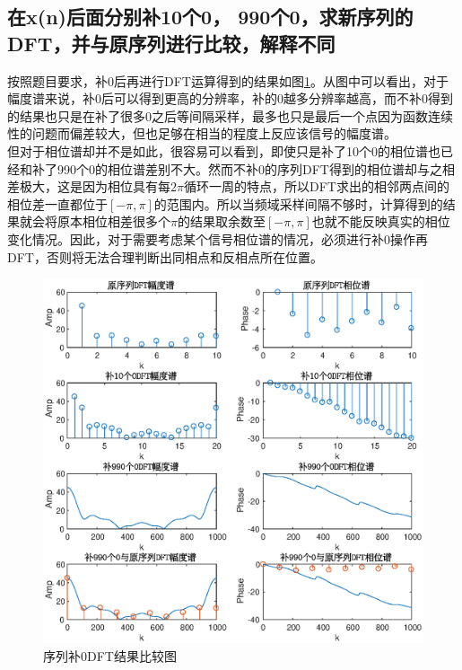 \documentclass[UTF8]{article}
\begin{document}
\begin{CJK}{UTF8}{gkai}
\subsection{在x(n)后面分别补10个0， 990个0，求新序列的DFT，并与原序列进行比较，解释不同}
按照题目要求，补0后再进行DFT运算得到的结果如图\ref{pro1_fig4}。从图中可以看出，对于幅度谱来说，补0后可以得到更高的分辨率，补的0越多分辨率越高，而不补0得到的结果也只是在补了很多0之后等间隔采样，最多也只是最后一个点因为函数连续性的问题而偏差较大，但也足够在相当的程度上反应该信号的幅度谱。\\
但对于相位谱却并不是如此，很容易可以看到，即使只是补了10个0的相位谱也已经和补了990个0的相位谱差别不大。然而不补0的序列DFT得到的相位谱却与之相差极大，这是因为相位具有每$2\pi$循环一周的特点，所以DFT求出的相邻两点间的相位差一直都位于$[-\pi,\pi]$的范围内。所以当频域采样间隔不够时，计算得到的结果就会将原本相位相差很多个$\pi$的结果取余数至$[-\pi,\pi]$也就不能反映真实的相位变化情况。因此，对于需要考虑某个信号相位谱的情况，必须进行补0操作再DFT，否则将无法合理判断出同相点和反相点所在位置。
\begin{figure}
  \includegraphics[scale=0.5]{pro1_subpro3.eps}
  \caption{序列补0DFT结果比较图}
  \label{pro1_fig4}
\end{figure}

\end{CJK}
\end{document}
